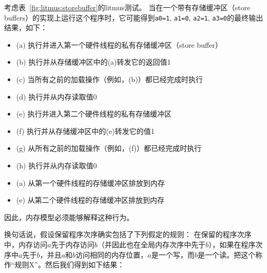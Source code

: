 考虑表~\ref{fig:litmus:storebuffer}的litmus测试。
当在一个带有存储缓冲区（store buffers）的实现上运行这个程序时，它可能得到{\tt a0=1}, {\tt a1=0}, {\tt a2=1}, {\tt a3=0}的最终输出结果，如下：
\begin{itemize}
  \item (a) 执行并进入第一个硬件线程的私有存储缓冲区（store buffer）  %
  \item (b) 执行并从存储缓冲区中的(a)转发它的返回值1  %
  \item (c) 当所有之前的加载操作（例如，(b)）都已经完成时执行  %
  \item (d) 执行并从内存读取值0  %
  \item (e) 执行并进入第二个硬件线程的私有存储缓冲区  %
  \item (f) 执行并从存储缓冲区中的(e)转发它的值1  %
  \item (g) 从所有之前的加载操作（例如，(f)）都已经完成时执行  %
  \item (h) 执行并从内存读取值0  %
  \item (a) 从第一个硬件线程的存储缓冲区排放到内存  %
  \item (e) 从第二个硬件线程的存储缓冲区排放到内存  %
\end{itemize}
因此，内存模型必须能够解释这种行为。

换句话说，假设保留程序次序确实包括了下列假定的规则：
在保留的程序次序中，内存访问$a$先于内存访问$b$（并因此也在全局内存次序中先于$b$），如果在程序次序中$a$先于$b$，并且$a$和$b$访问相同的内存位置，$a$是一个写，而$b$是一个读。把这个称作“规则X”。然后我们得到如下结果：

